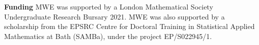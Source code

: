 \documentclass[11pt]{article}
\theoremstyle{remark}
\begin{document}
\textbf{Funding} 
MWE was supported by a London Mathematical Society Undergraduate Research Bursary 2021.
MWE was also supported by a scholarship from the EPSRC Centre for Doctoral Training in Statistical Applied Mathematics at Bath (SAMBa), under the project EP/S022945/1. 



\end{document}
